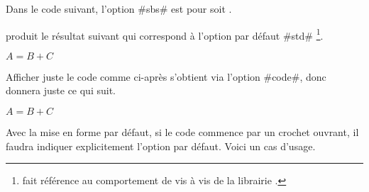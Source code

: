 \documentclass[10pt, a4paper]{article}
\begin{document}
\begin{tdocexa}
    Dans le code suivant, l'option \tdocinlatex#sbs# est pour  soit .

\end{tdocexa}




\begin{tdocexa}[À la suite]
     produit le résultat suivant qui correspond à l'option par défaut \tdocinlatex#std#
    \footnote{
         fait référence au comportement  de  vis à vis de la librairie .
    }.

    \begin{tdoclatex}
        $A = B + C$
    \end{tdoclatex}
\end{tdocexa}




\begin{tdocexa}
    Afficher juste le code comme ci-après s'obtient via l'option \tdocinlatex#code#, donc  donnera juste ce qui suit.

    \begin{tdoclatex}[code]
        $A = B + C$
    \end{tdoclatex}
\end{tdocexa}




\begin{tdocwarn}
    Avec la mise en forme par défaut, si le code commence par un crochet ouvrant, il faudra indiquer explicitement l'option par défaut. Voici un cas d'usage.

\end{tdocwarn}
\end{document}

